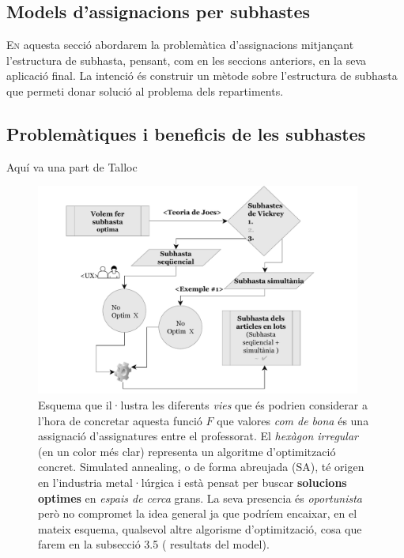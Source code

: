 \documentclass[10pt,twocolumn]{article}
\begin{document}
\newpage
\newpage
\begin{tcolorbox}[colframe=white,colback=redviolet!20,sharp corners=all,size=minimal,halign=center,valign=center]
	\section{Models d'assignacions per subhastes}
\end{tcolorbox}
\lettrine{E}n aquesta secció abordarem la problemàtica d'assignacions mitjançant l'estructura de subhasta, pensant, com en les seccions anteriors, en la seva aplicació final. La intenció  és construir un mètode sobre l'estructura de subhasta que permeti  donar solució al problema dels repartiments.
\subsection{Problemàtiques i beneficis de les subhastes}
Aquí va una part de Talloc
\begin{figure}
	\centering
	\includegraphics[width=10.7cm]{subs}
	\caption{ \footnotesize Esquema que il·lustra les diferents \textit{vies} que és podrien considerar a l'hora de concretar aquesta funció $F$ que valores \textit{com de bona}  és una assignació d'assignatures entre el professorat. El \textit{hexàgon irregular}   (en un color més clar) representa un algoritme d'optimització concret. Simulated annealing, o de forma abreujada (SA), té origen en l'industria metal·lúrgica i està pensat per buscar \textbf{solucions optimes} en \textit{espais de cerca} grans. La seva presencia és \textit{oportunista} però no compromet la idea general ja que podríem encaixar, en el mateix esquema, qualsevol altre algorisme d'optimització, cosa que farem en la subsecció 3.5 ( resultats del model).}
	\label{fig:4}
\end{figure}
\end{document}
